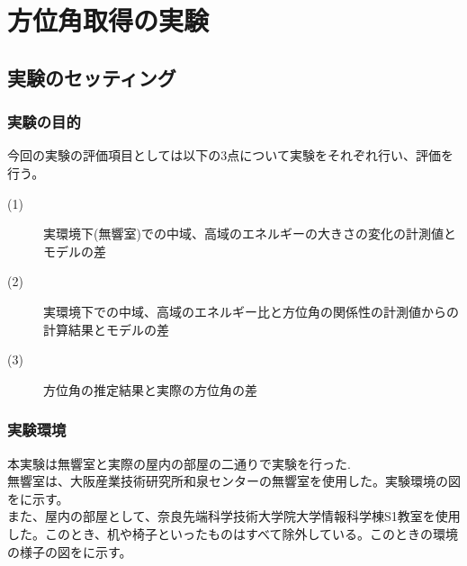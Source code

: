 \section{方位角取得の実験}
\label{chap:exp_azimuth_angle}
\subsection{実験のセッティング}
\label{sec:anechoic_chamber}
\subsubsection{実験の目的}\label{exp_popse}
今回の実験の評価項目としては以下の3点について実験をそれぞれ行い、評価を行う。
\begin{description}
  \item[(1)] 実環境下(無響室)での中域、高域のエネルギーの大きさの変化の計測値とモデルの差
  \item[(2)] 実環境下での中域、高域のエネルギー比と方位角の関係性の計測値からの計算結果とモデルの差
  \item[(3)] 方位角の推定結果と実際の方位角の差
\end{description}

\subsubsection{実験環境}
本実験は無響室と実際の屋内の部屋の二通りで実験を行った.\\
無響室は、大阪産業技術研究所和泉センター\cite{url_orist}の無響室を使用した。実験環境の図をに示す。\\
また、屋内の部屋として、奈良先端科学技術大学院大学情報科学棟S1教室を使用した。このとき、机や椅子といったものはすべて除外している。このときの環境の様子の図をに示す。\\


